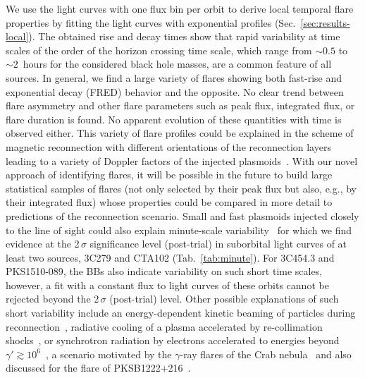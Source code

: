 \documentclass[twocolumn,linenumbers]{aastex62}
\newcommand{\gray}{$\gamma$-ray\xspace}
\begin{document}
We use the light curves with one flux bin per orbit to derive local temporal flare properties by fitting the light curves with exponential  profiles (Sec.~\ref{sec:results-local}).
The obtained rise and decay times show that rapid variability at time scales of the order of the horizon crossing time scale, which range from $\sim 0.5$ to $\sim 2$ \,hours for the considered black hole masses, are a common feature of all sources.
In general, we find a large variety of flares showing both fast-rise and exponential decay (FRED) behavior and the opposite. 
No clear trend between flare asymmetry and other flare parameters such as peak flux, integrated flux, or flare duration is found. 
No apparent evolution of these quantities with time is observed either. 
This variety of flare profiles could be explained in the scheme of magnetic reconnection with different orientations of the reconnection layers leading to a variety of Doppler factors of the injected plasmoids~\citep[e.g.,][]{2016MNRAS.462.3325P,2018MNRAS.tmp.2522C}. 
With our novel approach of identifying flares, it will be possible in the future to build large statistical samples of flares (not only selected by their peak flux but also, e.g., by their integrated flux) whose properties could be compared in more detail to predictions of the reconnection scenario.
Small and fast plasmoids injected closely to the line of sight could also explain minute-scale variability~\citep{2016MNRAS.462.3325P} for which we find evidence at the 2\,$\sigma$ significance level (post-trial) in suborbital light curves of at least two sources, 3C279 and CTA102 (Tab.~\ref{tab:minute}). 
For 3C454.3 and PKS1510-089, the BBs also indicate variability on such short time scales, however, a fit with a constant flux to light curves of these orbits cannot be rejected beyond the $2\,\sigma$ (post-trial) level.
Other possible explanations of such short variability include an energy-dependent kinetic beaming of particles during reconnection~\citep{2012ApJ...754L..33C}, radiative cooling of a plasma accelerated by re-collimation shocks~\citep{Bodo:2017qqn}, or synchrotron radiation by electrons accelerated to energies beyond $\gamma' \gtrsim 10^6$~\citep{TheFermi-LAT:2016dss}, a scenario motivated by the \gray flares of the Crab nebula~\citep{2011Sci...331..739A} and also discussed for the flare of PKSB1222+216~\citep{2012MNRAS.425.2519N}.
\end{document}
